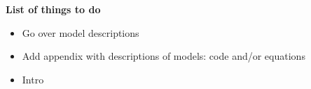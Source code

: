 \textbf{List of things to do}
\begin{itemize}

\item Go over model descriptions
\item Add appendix with descriptions of models: code and/or equations
\item Intro
\end{itemize}
